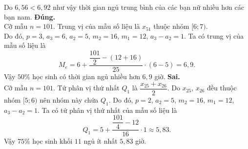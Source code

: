 \begin{ex}
{\begin{itemchoice}
			Do $6{,}56<6{,}92$ như vậy thời gian  ngủ trung bình của các bạn nữ nhiều hơn các bạn nam.
			 \itemch \textbf{Đúng.}\\
			Cỡ mẫu $n=101$. Trung vị của mẫu số liệu  là $x_{51}$ thuộc nhóm $[6;7)$.\\
			Do đó, $p=3$, $a_{3}=6$, $a_{2}=5$, $m_{2}=16$, $m_{1}=12$, $a_{3}-a_{2}=1$.  Ta có trung vị của mẫu số liệu là
			\[M_{e}=6+\dfrac{\dfrac{101}{2}-(12+16)}{25} \cdot  (6-5)=6{,}9.\]
			Vậy $50\%$ học sinh có thời gian ngủ nhiều hơn $6{,}9$  giờ.
			\itemch  \textbf{Sai.}\\
			Cỡ mẫu $n=101$. Tứ phân vị thứ nhất $Q_{1}$ là $\dfrac{x_{25}+x_{26}}{2}$. Do $x_{25}$, $x_{26}$ đều thuộc nhóm $[5;6)$ nên nhóm này chứa $Q_{1}$. Do đó, $p=2$, $a_{2}=5$, $m_{2}=16$, $m_{1}=12$, $a_{3}-a_{2}=1$. Ta có tứ  phân vị thứ nhất của mẫu số liệu là
			\[Q_{1}=5+\dfrac{\dfrac{101}{4}-12}{16} \cdot 1\approx  5{,}83.\]
			Vậy $75\%$ học sinh khối  $11$ ngủ ít nhất $5{,}83$ giờ.
		\end{itemchoice}
	 }
\end{ex}


